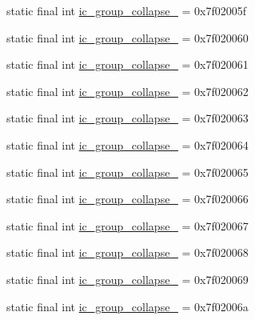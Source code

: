 \begin{CompactItemize}
\item 
static final int \hyperlink{classandroid_1_1support_1_1v7_1_1recyclerview_1_1_r_1_1drawable_af8aa438238e6ef3f830ed71dbe12f1a}{ic\_\-group\_\-collapse\_} = 0x7f02005f
\item 
static final int \hyperlink{classandroid_1_1support_1_1v7_1_1recyclerview_1_1_r_1_1drawable_b6722b59da14bb9523979c3ee8449c68}{ic\_\-group\_\-collapse\_} = 0x7f020060
\item 
static final int \hyperlink{classandroid_1_1support_1_1v7_1_1recyclerview_1_1_r_1_1drawable_97743bada29d605ed167ef6a243cff7f}{ic\_\-group\_\-collapse\_} = 0x7f020061
\item 
static final int \hyperlink{classandroid_1_1support_1_1v7_1_1recyclerview_1_1_r_1_1drawable_03d5fdcc1a978d533e8a936286a6455b}{ic\_\-group\_\-collapse\_} = 0x7f020062
\item 
static final int \hyperlink{classandroid_1_1support_1_1v7_1_1recyclerview_1_1_r_1_1drawable_cbb2ed1daa6100bb0b0069a9682f1c9a}{ic\_\-group\_\-collapse\_} = 0x7f020063
\item 
static final int \hyperlink{classandroid_1_1support_1_1v7_1_1recyclerview_1_1_r_1_1drawable_c09d5b14545ac8f0f793a596717559c2}{ic\_\-group\_\-collapse\_} = 0x7f020064
\item 
static final int \hyperlink{classandroid_1_1support_1_1v7_1_1recyclerview_1_1_r_1_1drawable_839d26f07dff7f04a2f66fb5e9eb8aa6}{ic\_\-group\_\-collapse\_} = 0x7f020065
\item 
static final int \hyperlink{classandroid_1_1support_1_1v7_1_1recyclerview_1_1_r_1_1drawable_e5c6d0363492891bcb75523de78956e7}{ic\_\-group\_\-collapse\_} = 0x7f020066
\item 
static final int \hyperlink{classandroid_1_1support_1_1v7_1_1recyclerview_1_1_r_1_1drawable_6b71bf4025efb421b29662dd1e0b8576}{ic\_\-group\_\-collapse\_} = 0x7f020067
\item 
static final int \hyperlink{classandroid_1_1support_1_1v7_1_1recyclerview_1_1_r_1_1drawable_a47ff329fdc72a223851d37ceef38067}{ic\_\-group\_\-collapse\_} = 0x7f020068
\item 
static final int \hyperlink{classandroid_1_1support_1_1v7_1_1recyclerview_1_1_r_1_1drawable_47b82ff58033eaad9d73e51c9e3ec807}{ic\_\-group\_\-collapse\_} = 0x7f020069
\item 
static final int \hyperlink{classandroid_1_1support_1_1v7_1_1recyclerview_1_1_r_1_1drawable_0dd9b74cf351387bf367ddf1a32ce323}{ic\_\-group\_\-collapse\_} = 0x7f02006a

\end{CompactItemize}

